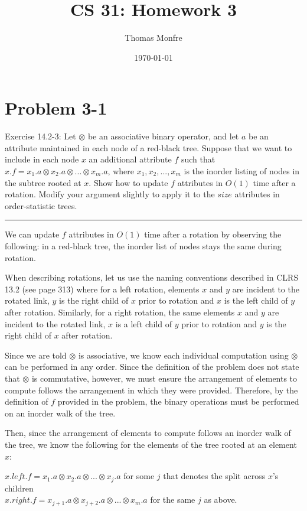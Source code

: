 \documentclass[11pt]{article}
\title{CS 31: Homework 3}
\author{Thomas Monfre}
\date{\today}
\def\separateline{\medskip\hrule\medskip}
\begin{document}
\maketitle

\section{Problem 3-1}
Exercise 14.2-3: Let $\otimes$ be an associative binary operator, and let $a$ be an attribute maintained in each node of a red-black tree. Suppose that we want to include in each node $x$ an additional attribute $f$ such that $x.f = x_1.a \otimes x_2.a \otimes ... \otimes x_m.a$, where $x_1, x_2, ..., x_m$ is the inorder listing of nodes in the subtree rooted at $x$. Show how to update $f$ attributes in $O(1)$ time after a rotation. Modify your argument slightly to apply it to the $size$ attributes in order-statistic trees.
\separateline

We can update $f$ attributes in $O(1)$ time after a rotation by observing the following: in a red-black tree, the inorder list of nodes stays the same during rotation.

When describing rotations, let us use the naming conventions described in CLRS 13.2 (see page 313) where for a left rotation, elements $x$ and $y$ are incident to the rotated link, $y$ is the right child of $x$ prior to rotation and $x$ is the left child of $y$ after rotation. Similarly, for a right rotation, the same elements $x$ and $y$ are incident to the rotated link, $x$ is a left child of $y$ prior to rotation and $y$ is the right child of $x$ after rotation.

Since we are told $\otimes$ is associative, we know each individual computation using $\otimes$ can be performed in any order. Since the definition of the problem does not state that $\otimes$ is commutative, however, we must ensure the arrangement of elements to compute follows the arrangement in which they were provided. Therefore, by the definition of $f$ provided in the problem, the binary operations must be performed on an inorder walk of the tree.

Then, since the arrangement of elements to compute follows an inorder walk of the tree, we know the following for the elements of the tree rooted at an element $x$:

$x.left.f = x_1.a \otimes x_2.a \otimes ... \otimes x_j.a$ for some $j$ that denotes the split across $x$'s children\\
$x.right.f = x_{j+1}.a \otimes x_{j+2}.a \otimes ... \otimes x_m.a$ for the same $j$ as above.
\end{document}
